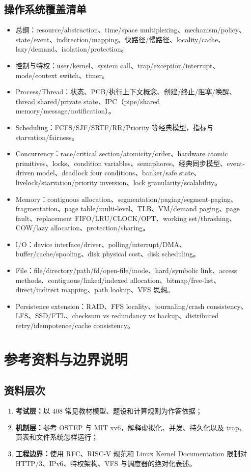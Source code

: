 \documentclass[11pt,a4paper,openany]{ctexbook}
\newcommand{\key}[1]{\textbf{\color{deep}#1}}
\begin{document}
\section{操作系统覆盖清单}
\begin{itemize}
  \item 总纲：resource/abstraction、time/space multiplexing、mechanism/policy、state/event、indirection/mapping、快路径/慢路径、locality/cache、lazy/demand、isolation/protection。
  \item 控制与特权：user/kernel、system call、trap/exception/interrupt、mode/context switch、timer。
  \item Process/Thread：状态、PCB/执行上下文概念、创建/终止/阻塞/唤醒、thread shared/private state、IPC（pipe/shared memory/message/notification）。
  \item Scheduling：FCFS/SJF/SRTF/RR/Priority 等经典模型，指标与 starvation/fairness。
  \item Concurrency：race/critical section/atomicity/order、hardware atomic primitives、locks、condition variables、semaphores、经典同步模型、event-driven model、deadlock four conditions、banker/safe state、livelock/starvation/priority inversion、lock granularity/scalability。
  \item Memory：contiguous allocation、segmentation/paging/segment-paging、fragmentation、page table/multi-level、TLB、VM/demand paging、page fault、replacement FIFO/LRU/CLOCK/OPT、working set/thrashing、COW/lazy allocation、protection/sharing。
  \item I/O：device interface/driver、polling/interrupt/DMA、buffer/cache/spooling、disk physical cost、disk scheduling。
  \item File：file/directory/path/fd/open-file/inode、hard/symbolic link、access methods、contiguous/linked/indexed allocation、bitmap/free-list、direct/indirect mapping、path lookup、VFS 思想。
  \item Persistence extension：RAID、FFS locality、journaling/crash consistency、LFS、SSD/FTL、checksum vs redundancy vs backup、distributed retry/idempotence/cache consistency。
\end{itemize}

\chapter{参考资料与边界说明}

\section{资料层次}
\begin{enumerate}
  \item \key{考试层：}以 408 常见教材模型、题设和计算规则为作答依据；
  \item \key{机制层：}参考 OSTEP 与 MIT xv6，解释虚拟化、并发、持久化以及 trap、页表和文件系统怎样运行；
  \item \key{工程边界：}使用 RFC、RISC-V 规范和 Linux Kernel Documentation 限制对 HTTP/3、IPv6、特权架构、VFS 与调度器的绝对化表述。
\end{enumerate}
\end{document}
